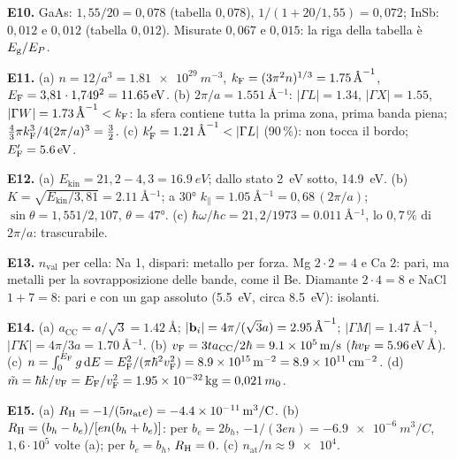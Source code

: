 \documentclass[11pt,a4paper]{article}
\begin{document}
\smallskip\noindent\textbf{E10.} GaAs: $1{,}55/20=0{,}078$ (tabella $0{,}078$), $1/(1+20/1{,}55)=0{,}072$; InSb: $0{,}012$ e $0{,}012$ (tabella $0{,}012$).
Misurate $0{,}067$ e $0{,}015$: la riga della tabella è $E_{\mathrm g}/E_P$.

\smallskip\noindent\textbf{E11.} (a) $n=12/a^3=\SI{1.81e29}{m^{-3}}$, $k_{\mathrm F}=(3\pi^2n)^{1/3}=\SI{1.75}{\angstrom^{-1}}$, $E_{\mathrm F}=3{,}81\cdot1{,}749^2=
\SI{11.65}{eV}$. (b) $2\pi/a=\SI{1.551}{\angstrom^{-1}}$: $|\Gamma L|=\num{1.34}$, $|\Gamma X|=\num{1.55}$, $|\Gamma W|=\SI{1.73}{\angstrom^{-1}}<k_{\mathrm F}$: la
sfera contiene tutta la prima zona, prima banda piena; $\frac43\pi k_{\mathrm F}^3/4(2\pi/a)^3=\frac32$. (c) $\kF'=\SI{1.21}{\angstrom^{-1}}<|\Gamma L|$ (90\,\%):
non tocca il bordo; $E_{\mathrm F}'=\SI{5.6}{eV}$.

\smallskip\noindent\textbf{E12.} (a) $E_{\mathrm{kin}}=21{,}2-4{,}3=\SI{16.9}{eV}$; dallo stato \SI{2}{eV} sotto, \SI{14.9}{eV}. (b) $K=\sqrt{E_{\mathrm{kin}}
/3{,}81}=\SI{2.11}{\angstrom^{-1}}$; a \ang{30} $k_\parallel=\SI{1.05}{\angstrom^{-1}}=0{,}68\,(2\pi/a)$; $\sin\theta=1{,}551/2{,}107$, $\theta=\ang{47}$.
(c) $\hbar\omega/\hbar c=21{,}2/1973=\SI{0.011}{\angstrom^{-1}}$, lo $0{,}7\,\%$ di $2\pi/a$: trascurabile.

\smallskip\noindent\textbf{E13.} $n_{\mathrm{val}}$ per cella: Na 1, dispari: metallo per forza. Mg $2\cdot2=4$ e Ca 2: pari, ma metalli per la
sovrapposizione delle bande, come il Be. Diamante $2\cdot4=8$ e NaCl $1+7=8$: pari e con un gap assoluto (\SI{5.5}{eV}, circa \SI{8.5}{eV}): isolanti.

\smallskip\noindent\textbf{E14.} (a) $a_{\mathrm{CC}}=a/\sqrt3=\SI{1.42}{\angstrom}$; $|\mathbf b_i|=4\pi/(\sqrt3a)=\SI{2.95}{\angstrom^{-1}}$;
$|\Gamma M|=\SI{1.47}{\angstrom^{-1}}$, $|\Gamma K|=4\pi/3a=\SI{1.70}{\angstrom^{-1}}$. (b) $v_{\mathrm F}=3ta_{\mathrm{CC}}/2\hbar=\SI{9.1e5}{m/s}$
($\hbar v_{\mathrm F}=\SI{5.96}{eV.\angstrom}$). (c) $n=\int_0^{E_{\mathrm F}}g\,\mathrm d E=E_{\mathrm F}^2/(\pi\hbar^2v_{\mathrm F}^2)=\SI{8.9e15}{m^{-2}}=\SI{8.9e11}{cm^{-2}}$. (d) $\tilde m=\hbar k/v_{\mathrm F}=E_{\mathrm F}/v_{\mathrm F}^2=\SI{1.95e-32}{kg}=0{,}021\,m_0$.

\smallskip\noindent\textbf{E15.} (a) $R_{\mathrm H}=-1/(5n_{\mathrm{at}}e)=\SI{-4.4e-11}{m^3/C}$. (b) $R_{\mathrm H}=(b_h-b_e)/[en(b_h+b_e)]$: per $b_e=2b_h$,
$-1/(3en)=\SI{-6.9e-6}{m^3/C}$, $1{,}6\cdot10^5$ volte (a); per $b_e=b_h$, $R_{\mathrm H}=0$. (c) $n_{\mathrm{at}}/n\approx\num{9e4}$.
\endgroup
\end{document}
